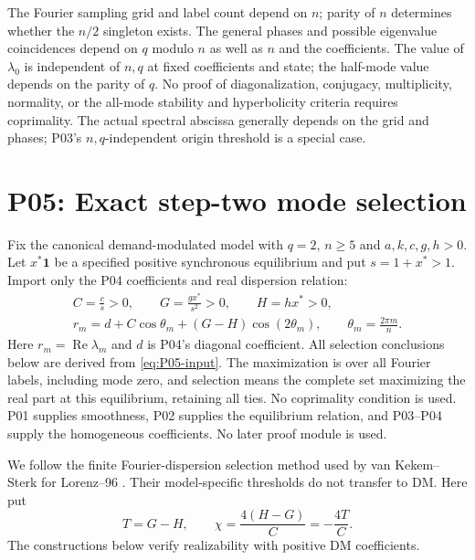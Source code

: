 \documentclass[11pt]{article}
\newcommand{\one}{\mathbf{1}}
\DeclareMathOperator{\Ree}{Re}
\theoremstyle{definition}
\theoremstyle{remark}
\begin{document}
The Fourier sampling grid and label count depend on $n$; parity of
$n$ determines whether the $n/2$ singleton exists. The general phases
and possible eigenvalue coincidences depend on $q$ modulo $n$ as
well as $n$ and the coefficients. The value of $\lambda_0$ is
independent of $n,q$ at fixed coefficients and state; the half-mode
value depends on the parity of $q$. No proof of diagonalization,
conjugacy, multiplicity, normality, or the all-mode stability and
hyperbolicity criteria requires coprimality. The actual spectral
abscissa generally depends on the grid and phases; P03's
$n,q$-independent origin threshold is a special case.


\section{P05: Exact step-two mode selection}
\label{sec:P05}
Fix the canonical demand-modulated model with $q=2$, $n\ge5$ and
$a,k,c,g,h>0$. Let $x^*\one$ be a specified positive synchronous
equilibrium and put $s=1+x^*>1$. Import only the P04 coefficients
and real dispersion relation:
\begin{equation}
\begin{gathered}
 C=\frac cs>0,\qquad G=\frac{gx^*}{s^2}>0,\qquad H=hx^*>0,\\
 r_m=d+C\cos\theta_m+(G-H)\cos(2\theta_m),\qquad
 \theta_m=\frac{2\pi m}{n}.
\end{gathered}
 \label{eq:P05-input}
\end{equation}
Here $r_m=\Ree\lambda_m$ and $d$ is P04's diagonal coefficient.
All selection conclusions below are derived from \eqref{eq:P05-input}.
The maximization is over all Fourier labels, including mode zero, and
selection means the complete set maximizing the real part at this
equilibrium, retaining all ties. No coprimality condition is used.
P01 supplies smoothness, P02 supplies the equilibrium relation, and P03--P04
supply the homogeneous coefficients. No later proof module is used.


We follow the finite Fourier-dispersion selection method used by
van Kekem--Sterk for Lorenz--96 \cite[\S2.1, Proposition~5]{vanKekemSterk2018}.
Their model-specific thresholds do not transfer to DM. Here put
\begin{equation}
 T=G-H,\qquad \chi=\frac{4(H-G)}C=-\frac{4T}C.
 \label{eq:P05-control}
\end{equation}
The constructions below verify realizability with positive DM coefficients.
\end{document}
